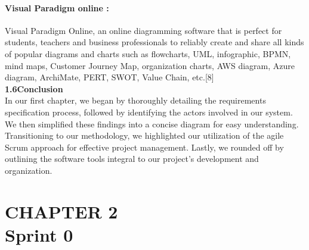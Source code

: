 \documentclass{article}
\begin{document}
\paragraph{Visual Paradigm online :} 
Visual Paradigm Online, an online diagramming software that is perfect for students, teachers and business professionals to reliably create and share all kinds of popular diagrams and charts such as flowcharts, UML, infographic, BPMN, mind maps, Customer Journey Map, organization charts, AWS diagram, Azure diagram, ArchiMate, PERT, SWOT, Value Chain, etc.[8]\vspace{1cm}\\





{\Large \textbf{1.6\hspace{1em}Conclusion}}\vspace{0.2cm}\\
In our first chapter, we began by thoroughly detailing the requirements specification process, followed by identifying the actors involved in our system. We then simplified these findings into a concise diagram for easy understanding. Transitioning to our methodology, we highlighted our utilization of the agile Scrum approach for effective project management. Lastly, we rounded off by outlining the software tools integral to our project's development and organization.
\newpage
\section*{\Huge CHAPTER 2\vspace{0.5cm}\\Sprint 0}
\vspace{1.5cm}
\end{document}
